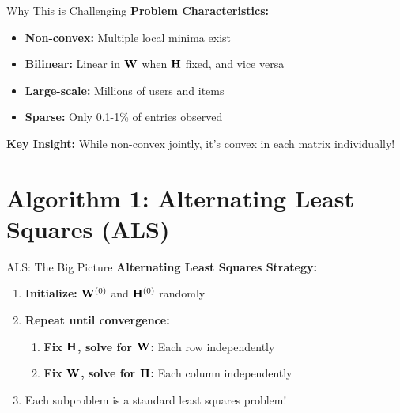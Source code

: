 \documentclass{beamer}
\begin{document}
\begin{frame}{Why This is Challenging}
\textbf{Problem Characteristics:}
\begin{itemize}[<+->]
    \item \textbf{Non-convex:} Multiple local minima exist
    \item \textbf{Bilinear:} Linear in $\mathbf{W}$ when $\mathbf{H}$ fixed, and vice versa
    \item \textbf{Large-scale:} Millions of users and items
    \item \textbf{Sparse:} Only 0.1-1\% of entries observed
\end{itemize}

\pause
\textbf{Key Insight:} While non-convex jointly, it's convex in each matrix individually!
\end{frame}

\section{Algorithm 1: Alternating Least Squares (ALS)}

\begin{frame}{ALS: The Big Picture}
\textbf{Alternating Least Squares Strategy:}

\pause
\begin{enumerate}[<+->]
    \item \textbf{Initialize:} $\mathbf{W}^{(0)}$ and $\mathbf{H}^{(0)}$ randomly
    \item \textbf{Repeat until convergence:}
    \begin{enumerate}
        \item \textbf{Fix $\mathbf{H}$, solve for $\mathbf{W}$:} Each row independently
        \item \textbf{Fix $\mathbf{W}$, solve for $\mathbf{H}$:} Each column independently  
    \end{enumerate}
    \item Each subproblem is a standard least squares problem!
\end{enumerate}

\pause
\begin{center}
\end{center}
\end{frame}
\end{document}
